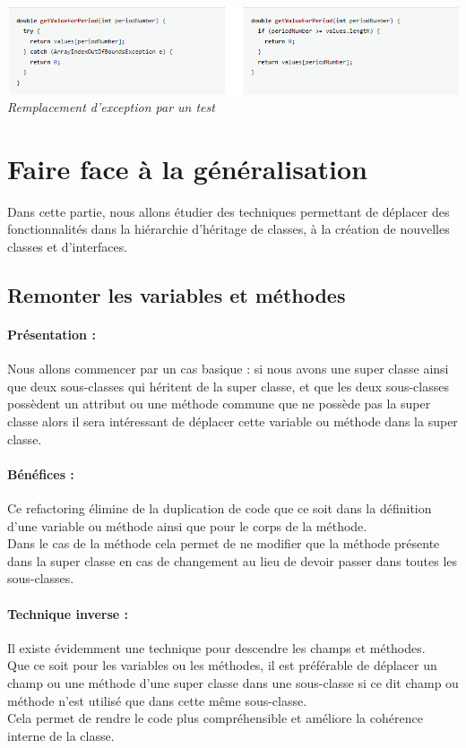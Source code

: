 \documentclass[a4paper,twoside,12pt,openright]{report}
\begin{document}
\begin{center}
\includegraphics[scale=0.75]{Image/ExceptionTest.png}\\
\itshape{Remplacement d'exception par un test \cite{ref5}}
\end{center}

\newpage
\section{Faire face à la généralisation}
Dans cette partie, nous allons étudier des techniques permettant de déplacer des fonctionnalités dans la hiérarchie d'héritage de classes, à la création de nouvelles classes et d'interfaces.\\



\subsection{Remonter les variables et méthodes}
\paragraph{Présentation :}
Nous allons commencer par un cas basique : si nous avons une super classe ainsi que deux sous-classes qui héritent de la super classe, et que les deux sous-classes possèdent un attribut ou une méthode commune que ne possède pas la super classe alors il sera intéressant de déplacer cette variable ou méthode dans la super classe.\\

\paragraph{Bénéfices :}
Ce refactoring élimine de la duplication de code que ce soit dans la définition d'une variable ou méthode ainsi que pour le corps de la méthode.\\
Dans le cas de la méthode cela permet de ne modifier que la méthode présente dans la super classe en cas de changement au lieu de devoir passer dans toutes les sous-classes.\\

\paragraph{Technique inverse :}
Il existe évidemment une technique pour descendre les champs et méthodes.\\
Que ce soit pour les variables ou les méthodes, il est préférable de déplacer un champ ou une méthode d'une super classe dans une sous-classe si ce dit champ ou méthode n'est utilisé que dans cette même sous-classe.\\
Cela permet de rendre le code plus compréhensible et améliore la cohérence interne de la classe.\\
\end{document}
